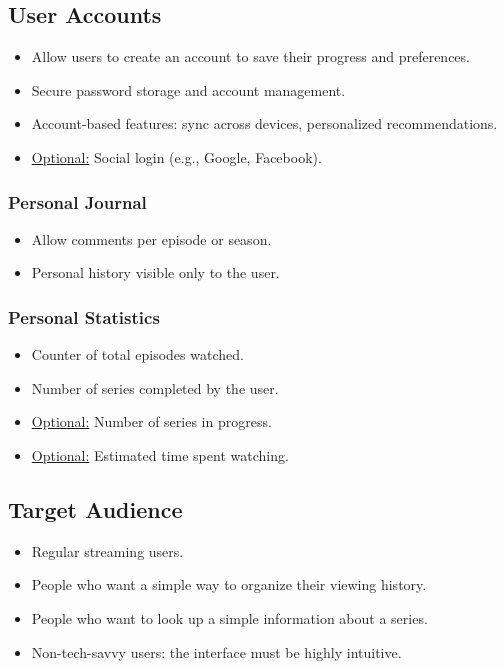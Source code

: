 \subsection{User Accounts}
\begin{itemize}
    \item Allow users to create an account to save their progress and preferences.
    \item Secure password storage and account management.
    \item Account-based features: sync across devices, personalized recommendations.
    \item \underline{Optional:} Social login (e.g., Google, Facebook).
\end{itemize}

\subsubsection{Personal Journal}
\begin{itemize}
    \item Allow comments per episode or season.
    \item Personal history visible only to the user.
\end{itemize}

\subsubsection{Personal Statistics}
\begin{itemize}
    \item Counter of total episodes watched.
    \item Number of series completed by the user.
    \item \underline{Optional:} Number of series in progress.
    \item \underline{Optional:} Estimated time spent watching.
\end{itemize}

\subsection{Target Audience}
\begin{itemize}
    \item Regular streaming users.
    \item People who want a simple way to organize their viewing history.
    \item People who want to look up a simple information about a series.
    \item Non-tech-savvy users: the interface must be highly intuitive.
\end{itemize}

